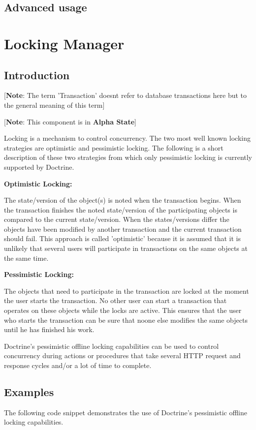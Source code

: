 \documentclass[11pt,a4paper]{report}
\begin{document}
\subsection{Advanced usage}
\section{Locking Manager}
\subsection{Introduction}
[\textbf{Note}: The term 'Transaction' doesnt refer to database transactions here but to the general meaning of this term]

[\textbf{Note}: This component is in \textbf{Alpha State}]

Locking is a mechanism to control concurrency. The two most well known locking strategies are optimistic and pessimistic locking. The following is a short description of these two strategies from which only pessimistic locking is currently supported by Doctrine.

\textbf{Optimistic Locking:}

The state/version of the object(s) is noted when the transaction begins. When the transaction finishes the noted state/version of the participating objects is compared to the current state/version. When the states/versions differ the objects have been modified by another transaction and the current transaction should fail. This approach is called 'optimistic' because it is assumed that it is unlikely that several users will participate in transactions on the same objects at the same time.

\textbf{Pessimistic Locking:}

The objects that need to participate in the transaction are locked at the moment the user starts the transaction. No other user can start a transaction that operates on these objects while the locks are active. This ensures that the user who starts the transaction can be sure that noone else modifies the same objects until he has finished his work.

Doctrine's pessimistic offline locking capabilities can be used to control concurrency during actions or procedures that take several HTTP request and response cycles and/or a lot of time to complete.

\subsection{Examples}
The following code snippet demonstrates the use of Doctrine's pessimistic offline locking capabilities.
\end{document}
